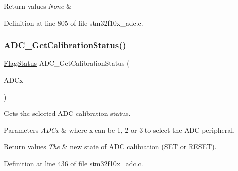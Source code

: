 \begin{DoxyRetVals}{Return values}
{\em None} & \\
\hline
\end{DoxyRetVals}


Definition at line 805 of file stm32f10x\+\_\+adc.\+c.

\mbox{\label{group___a_d_c___exported___functions_ga7a728f699b487c7fa1694d7424967122}} 
\subsubsection{\texorpdfstring{A\+D\+C\+\_\+\+Get\+Calibration\+Status()}{ADC\_GetCalibrationStatus()}}
{\footnotesize\ttfamily \hyperlink{group___exported__types_ga89136caac2e14c55151f527ac02daaff}{Flag\+Status} A\+D\+C\+\_\+\+Get\+Calibration\+Status (\begin{DoxyParamCaption}\item[{\hyperlink{struct_a_d_c___type_def}{A\+D\+C\+\_\+\+Type\+Def} $\ast$}]{A\+D\+Cx }\end{DoxyParamCaption})}



Gets the selected A\+DC calibration status. 


\begin{DoxyParams}{Parameters}
{\em A\+D\+Cx} & where x can be 1, 2 or 3 to select the A\+DC peripheral. \\
\hline
\end{DoxyParams}

\begin{DoxyRetVals}{Return values}
{\em The} & new state of A\+DC calibration (S\+ET or R\+E\+S\+ET). \\
\hline
\end{DoxyRetVals}


Definition at line 436 of file stm32f10x\+\_\+adc.\+c.

\mbox{\label{group___a_d_c___exported___functions_gaaf74221c285ec5dab5e66baf7bec6bd3}} 
